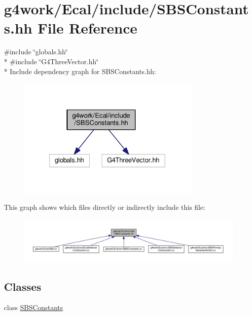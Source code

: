 \hypertarget{_s_b_s_constants_8hh}{\section{g4work/\-Ecal/include/\-S\-B\-S\-Constants.hh File Reference}
\label{_s_b_s_constants_8hh}
}
{\ttfamily \#include \char`\"{}globals.\-hh\char`\"{}}\\*
{\ttfamily \#include \char`\"{}G4\-Three\-Vector.\-hh\char`\"{}}\\*
Include dependency graph for S\-B\-S\-Constants.\-hh\-:\nopagebreak
\begin{figure}[H]
\begin{center}
\leavevmode
\includegraphics[width=255pt]{_s_b_s_constants_8hh__incl}
\end{center}
\end{figure}
This graph shows which files directly or indirectly include this file\-:\nopagebreak
\begin{figure}[H]
\begin{center}
\leavevmode
\includegraphics[width=350pt]{_s_b_s_constants_8hh__dep__incl}
\end{center}
\end{figure}
\subsection*{Classes}
\begin{DoxyCompactItemize}
\item 
class \hyperlink{class_s_b_s_constants}{S\-B\-S\-Constants}
\end{DoxyCompactItemize}
